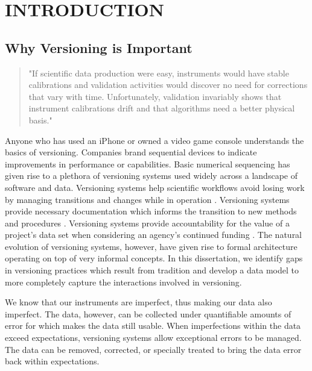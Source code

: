 
\chapter{INTRODUCTION}

\section{Why Versioning is Important}

\begin{quotation}
	"If scientific data production were easy, instruments would
	have stable calibrations and validation activities would discover no need for
	corrections that vary with time. Unfortunately, validation invariably shows that
	instrument calibrations drift and that algorithms need a better physical basis." \cite{Barkstrom2003}
\end{quotation}

Anyone who has used an iPhone or owned a video game console understands the basics of versioning.
Companies brand sequential devices to indicate improvements in performance or capabilities.
Basic numerical sequencing has given rise to a plethora of versioning systems used widely across a landscape of software and data.
Versioning systems help scientific workflows avoid losing work by managing transitions and changes while in operation \cite{Casati1996}.
Versioning systems provide necessary documentation which informs the transition to new methods and procedures \cite{Wiil:2000:RDH:338407.338517}.
Versioning systems provide accountability for the value of a project's data set when considering an agency's continued funding \cite{Cavanaugh2002}.
The natural evolution of versioning systems, however, have given rise to formal architecture operating on top of very informal concepts.
In this dissertation, we identify gaps in versioning practices which result from tradition and develop a data model to more completely capture the interactions involved in versioning.

We know that our instruments are imperfect, thus making our data also imperfect.
The data, however, can be collected under quantifiable amounts of error for which makes the data still usable.
When imperfections within the data exceed expectations, versioning systems allow exceptional errors to be managed.
The data can be removed, corrected, or specially treated to bring the data error back within expectations.


